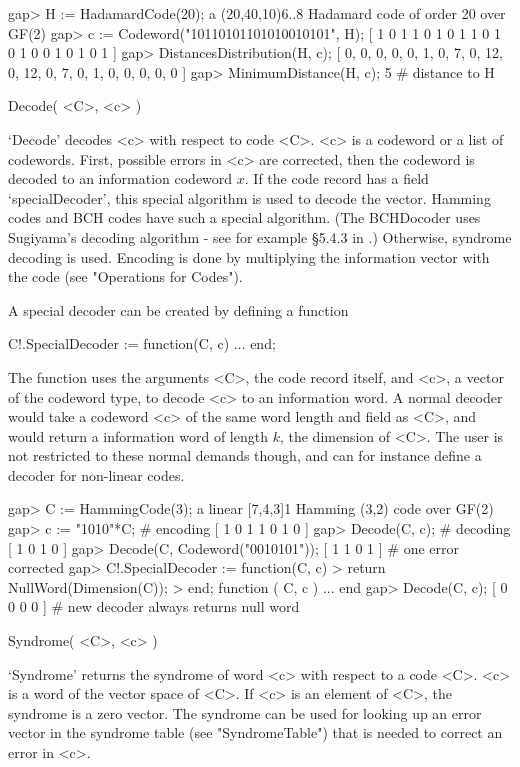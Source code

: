 \beginexample
gap> H := HadamardCode(20);
a (20,40,10)6..8 Hadamard code of order 20 over GF(2)
gap> c := Codeword("10110101101010010101", H);
[ 1 0 1 1 0 1 0 1 1 0 1 0 1 0 0 1 0 1 0 1 ]
gap> DistancesDistribution(H, c);
[ 0, 0, 0, 0, 0, 1, 0, 7, 0, 12, 0, 12, 0, 7, 0, 1, 0, 0, 0, 0, 0 ]
gap> MinimumDistance(H, c);
5                           # distance to H 
\endexample


\>Decode( <C>, <c> )

`Decode' decodes <c> with respect  to code <C>. <c>  is  a codeword or  a
list of codewords. First, possible errors  in <c> are corrected, then the
codeword is decoded to  an information codeword $x$.  If the code  record
has a  field `specialDecoder', this special  algorithm  is used to decode
the vector.  Hamming  codes and BCH  codes have such a special algorithm.
(The BCHDocoder uses Sugiyama's decoding algorithm - see for example
\S 5.4.3 in \cite{HP03}.)
Otherwise, syndrome decoding is used. Encoding is done by multiplying the
information vector with the code (see "Operations for Codes").

A special decoder can be created by defining a function

\begintt
C!.SpecialDecoder := function(C, c) ... end;
\endtt

The function uses  the arguments <C>, the code  record itself, and <c>, a
vector of  the  codeword type, to decode   <c> to an information word.  A
normal decoder  would take a codeword  <c>  of the  same  word length and
field as <C>, and  would  return a information  word  of length  $k$, the
dimension of   <C>. The user  is not  restricted  to these normal demands
though, and can for instance define a decoder for non-linear codes.

\beginexample
gap> C := HammingCode(3);
a linear [7,4,3]1 Hamming (3,2) code over GF(2)
gap> c := "1010"*C;                    # encoding
[ 1 0 1 1 0 1 0 ]
gap> Decode(C, c);                     # decoding
[ 1 0 1 0 ]
gap> Decode(C, Codeword("0010101"));
[ 1 1 0 1 ]                            # one error corrected
gap> C!.SpecialDecoder := function(C, c)
> return NullWord(Dimension(C));
> end;
function ( C, c ) ... end
gap> Decode(C, c);
[ 0 0 0 0 ]           # new decoder always returns null word 
\endexample

\>Syndrome( <C>, <c> )

`Syndrome' returns  the   syndrome of word <c>   with  respect to  a code
<C>. <c>  is a word of  the vector space of <C>.  If <c> is an element of
<C>, the syndrome is a zero vector. The  syndrome can be used for looking
up  an error vector in the  syndrome table (see  "SyndromeTable") that is
needed to correct an error in <c>.

